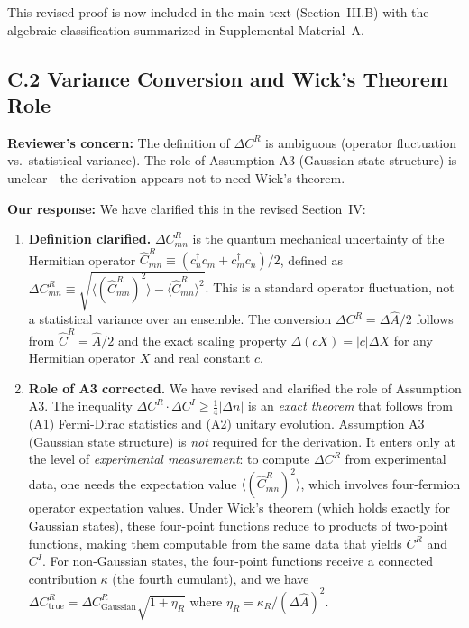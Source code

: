 \documentclass[11pt,a4paper]{article}
\begin{document}
This revised proof is now included in the main text (Section~III.B) with the algebraic classification summarized in Supplemental Material~A.

\subsection*{C.2 Variance Conversion and Wick's Theorem Role}

\textbf{Reviewer's concern:} The definition of $\Delta C^R$ is ambiguous (operator fluctuation vs.\ statistical variance). The role of Assumption A3 (Gaussian state structure) is unclear---the derivation appears not to need Wick's theorem.

\textbf{Our response:} We have clarified this in the revised Section~IV:

\begin{enumerate}[leftmargin=*]
\item \textbf{Definition clarified.} $\Delta C^R_{mn}$ is the quantum mechanical uncertainty of the Hermitian operator $\hat{C}^R_{mn} \equiv (c^\dagger_n c_m + c^\dagger_m c_n)/2$, defined as $\Delta C^R_{mn} \equiv \sqrt{\langle (\hat{C}^R_{mn})^2 \rangle - \langle \hat{C}^R_{mn} \rangle^2}$. This is a standard operator fluctuation, not a statistical variance over an ensemble. The conversion $\Delta C^R = \Delta \hat{A}/2$ follows from $\hat{C}^R = \hat{A}/2$ and the exact scaling property $\Delta(cX) = |c|\Delta X$ for any Hermitian operator $X$ and real constant $c$.

\item \textbf{Role of A3 corrected.} We have revised and clarified the role of Assumption A3. The inequality $\Delta C^R \cdot \Delta C^I \geq \frac{1}{4}|\Delta n|$ is an \emph{exact theorem} that follows from (A1) Fermi-Dirac statistics and (A2) unitary evolution. Assumption A3 (Gaussian state structure) is \emph{not} required for the derivation. It enters only at the level of \emph{experimental measurement}: to compute $\Delta C^R$ from experimental data, one needs the expectation value $\langle (\hat{C}^R_{mn})^2 \rangle$, which involves four-fermion operator expectation values. Under Wick's theorem (which holds exactly for Gaussian states), these four-point functions reduce to products of two-point functions, making them computable from the same data that yields $C^R$ and $C^I$. For non-Gaussian states, the four-point functions receive a connected contribution $\kappa$ (the fourth cumulant), and we have $\Delta C^R_{\text{true}} = \Delta C^R_{\text{Gaussian}} \sqrt{1 + \eta_R}$ where $\eta_R = \kappa_R / (\Delta \hat{A})^2$.


\end{enumerate}
\end{document}
